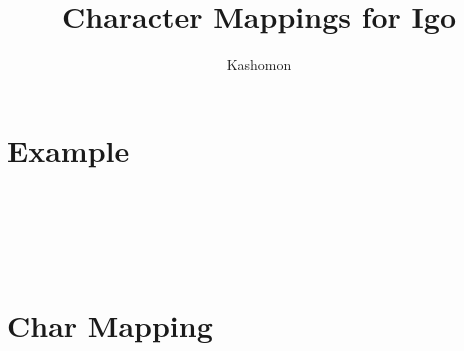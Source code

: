 \documentclass{article}
\begin{document}
\title{Character Mappings for Igo}
\author{Kashomon}
\maketitle

\section{Example}

{\jigofont%
\jigolaptest\jigotop{}\\
{\jigofontwi{}}\\
\\
\\
}

\section{Char Mapping}

\end{document}
